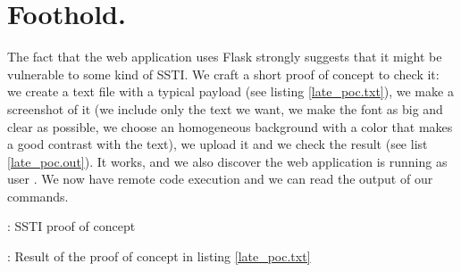 \section{Foothold.}
\par The fact that the web application uses Flask strongly suggests that it might be vulnerable to some kind of SSTI. We craft a short proof of concept to check it: we create a text file with a typical payload (see listing \ref{late_poc.txt}), we make a screenshot of it (we include only the text we want, we make the font as big and clear as possible, we choose an homogeneous background with a color that makes a good contrast with the text), we upload it and we check the result (see list \ref{late_poc.out}). It works, and we also discover the web application is running as user . We now have remote code execution and we can read the output of our commands.
\begin{listing}
	
	\caption{: SSTI proof of concept}
	\label{late_poc.txt}
\end{listing}
\begin{listing}
	
	\caption{: Result of the proof of concept in listing \ref{late_poc.txt}}
	\label{late_poc.out}
\end{listing}
